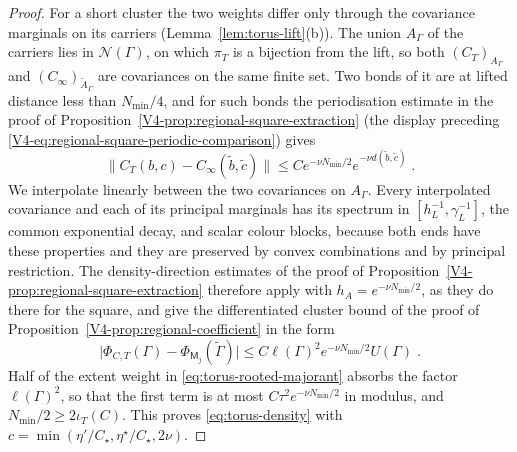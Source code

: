 \documentclass[11pt]{article}
\numberwithin{equation}{section}
\theoremstyle{remark}
\theoremstyle{plain}
\begin{document}
\begin{proof}
For a short cluster the two weights differ only through the covariance marginals on its carriers (Lemma~\ref{lem:torus-lift}(b)). The union $A_{\Gamma}$ of the carriers lies in $\mathscr N(\Gamma)$, on which $\pi_T$ is a bijection from the lift, so both $(C_T)_{A_{\Gamma}}$ and $(C_{\infty})_{\widetilde A_{\Gamma}}$ are covariances on the same finite set. Two bonds of it are at lifted distance less than $N_{\min}/4$, and for such bonds the periodisation estimate in the proof of Proposition~\ref{V4-prop:regional-square-extraction} (the display preceding \eqref{V4-eq:regional-square-periodic-comparison}) gives
\begin{equation}\label{eq:torus-covariance}
    \bigl\| C_T(b,c)-C_{\infty}(\tilde b,\tilde c)\bigr\|\leqslant Ce^{-\nu N_{\min}/2}e^{-\nu d(\tilde b,\tilde c)}\;.
\end{equation}
We interpolate linearly between the two covariances on $A_{\Gamma}$. Every interpolated covariance and each of its principal marginals has its spectrum in $[h_L^{-1},\gamma_L^{-1}]$, the common exponential decay, and scalar colour blocks, because both ends have these properties and they are preserved by convex combinations and by principal restriction. The density-direction estimates of the proof of Proposition~\ref{V4-prop:regional-square-extraction} therefore apply with $h_A= e^{-\nu N_{\min}/2}$, as they do there for the square, and give the differentiated cluster bound of the proof of Proposition~\ref{V4-prop:regional-coefficient} in the form
\begin{equation}\label{eq:torus-short-difference}
    \bigl|\Phi_{C,T}(\Gamma)-\Phi_{\mathsf M_j}(\widetilde\Gamma)\bigr|\leqslant C\ell(\Gamma)^2e^{-\nu N_{\min}/2}U(\Gamma)\;.
\end{equation}
Half of the extent weight in \eqref{eq:torus-rooted-majorant} absorbs the factor $\ell(\Gamma)^2$, so that the first term is at most $C\tau^2e^{-\nu N_{\min}/2}$ in modulus, and $N_{\min}/2\geqslant 2\iota_T(C)$. This proves \eqref{eq:torus-density} with $c=\min(\eta'/C_{\star},\eta^{\star}/C_{\star},2\nu)$.


\end{proof}
\end{document}
